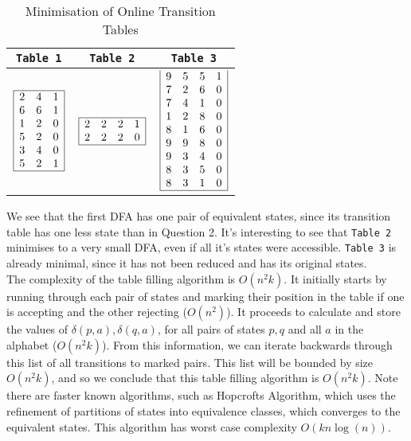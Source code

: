 \documentclass[10pt,a4paper,notitlepage]{article}
\begin{document}
\begin{table}[H]
\centering
\begin{tabular}{c|c|c}
 \texttt{Table 1} & \texttt{Table 2} &  \texttt{Table 3}\\ \hline 
$\begin{array}{|ccc|}
\hline
2 & 4 & 1\\ 6 & 6 & 1\\ 1 & 2 & 0\\ 5 & 2 & 0\\ 3 & 4 & 0\\ 5 & 2 & 1\\ \hline\end{array}$  & $
\begin{array}{|cccc|}\hline 2 & 2 & 2 & 1\\ 2 & 2 & 2 & 0\\ \hline \end{array}$ &  $\begin{array}{|cccc|}  9 & 5 & 5 & 1\\ 7 & 2 & 6 & 0\\ 7 & 4 & 1 & 0\\ 1 & 2 & 8 & 0\\ 8 & 1 & 6 & 0\\ 9 & 9 & 8 & 0\\ 9 & 3 & 4 & 0\\ 8 & 3 & 5 & 0\\ 8 & 3 & 1 & 0\\ \hline \end{array}$ \\ 
\end{tabular}
\caption{Minimisation of Online Transition Tables}\label{tb:5}
\end{table}

We see that the first DFA has one pair of equivalent states, since its transition table has one less state than in Question 2. It's interesting to see that \texttt{Table 2} minimises to a very small DFA, even if all it's states were accessible. \texttt{Table 3} is already minimal, since it has not been reduced and has its original states.\\

The complexity of the table filling algorithm is $O(n^{2}k)$. It initially starts by running through each pair of states and marking their position in the table if one is accepting and the other rejecting ($O(n^{2})$). It proceeds to calculate and store the values of $\delta(p,a),\delta(q,a)$, for all pairs of states $p,q$ and all $a$ in the alphabet ($O(n^{2}k)$). From this information, we can iterate backwards through this list of all transitions to marked pairs. This list will be bounded by size $O(n^{2}k)$, and so we conclude that this table filling algorithm is $O(n^{2}k)$. Note there are faster known algorithms, such as Hopcrofts Algorithm, which uses the refinement of partitions of states into equivalence classes, which converges to the equivalent states. This algorithm has worst case complexity $O(kn\log(n))$.
\end{document}
